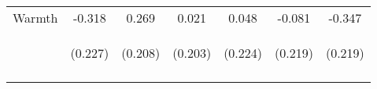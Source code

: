 \begin{tabular}{lcccccc}
\noalign{\smallskip}Warmth & -0.318 & 0.269 & 0.021 & 0.048 & -0.081 & -0.347\\
 & \begin{footnotesize}(0.227)\end{footnotesize} & \begin{footnotesize}(0.208)\end{footnotesize} & \begin{footnotesize}(0.203)\end{footnotesize} & \begin{footnotesize}(0.224)\end{footnotesize} & \begin{footnotesize}(0.219)\end{footnotesize} & \begin{footnotesize}(0.219)\end{footnotesize}\\
\noalign{\smallskip}\hline\end{tabular}\\
